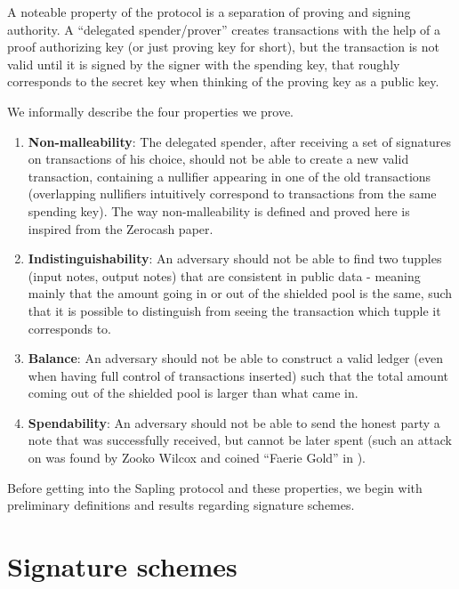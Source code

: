 \documentclass[11pt]{article}
\numberwithin{equation}{section} %
\numberwithin{figure}{section} %
\begin{document}
A noteable property of the protocol is a separation of proving and signing authority. A ``delegated spender/prover'' creates transactions with the help
of a proof authorizing key (or just proving key for short), but the transaction is not valid until it is signed by the signer with the spending key, that roughly corresponds to the secret key when thinking of the proving key as a public key.

We informally describe the four properties we prove.

\begin{enumerate}
 \item \textbf{Non-malleability}: The delegated spender, after receiving a set of signatures on transactions of his choice, should not be able to create a new valid transaction, containing a nullifier appearing in one of the old transactions (overlapping nullifiers intuitively correspond to transactions from the same spending key). The way non-malleability is defined and proved here is inspired from the Zerocash paper\cite{zerocash}.
 \item \textbf{Indistinguishability}: An adversary should not be able to find two tupples (input notes, output notes) that are consistent in public data - meaning mainly that the amount going in or out of the shielded pool is the same, such that it is possible to distinguish from seeing the transaction which tupple it corresponds to.
 \item \textbf{Balance}: An adversary should not be able to construct a valid ledger (even when having full control of transactions inserted) such that the total amount coming out of the shielded pool is larger than what came in.
 \item \textbf{Spendability}: An adversary should not be able to send the honest party a note that was successfully received, but cannot be later spent (such an attack on \cite{zerocash} was found by Zooko Wilcox and coined ``Faerie Gold'' in \cite{spec}).
\end{enumerate}

Before getting into the Sapling protocol and these properties, we begin with preliminary definitions and results regarding signature schemes.







\section{Signature schemes}\label{sec:signatures}
\end{document}
